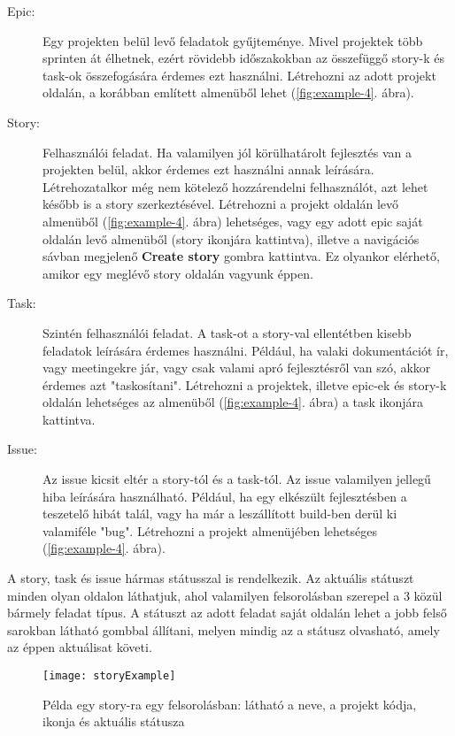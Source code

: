 \begin{description}
	\item[Epic:] Egy projekten belül levő feladatok gyűjteménye. Mivel projektek több sprinten át élhetnek, ezért rövidebb időszakokban az összefüggő story-k és task-ok összefogására érdemes ezt használni. Létrehozni az adott projekt oldalán, a korábban említett almenüből lehet (\ref{fig:example-4}. ábra). 
	\item[Story:] Felhasználói feladat. Ha valamilyen jól körülhatárolt fejlesztés van a projekten belül, akkor érdemes ezt használni annak leírására. Létrehozatalkor még nem kötelező hozzárendelni felhasználót, azt lehet később is a story szerkeztésével. Létrehozni a projekt oldalán levő almenüből (\ref{fig:example-4}. ábra) lehetséges, vagy egy adott epic saját oldalán levő almenüből (story ikonjára kattintva), illetve a navigációs sávban megjelenő \textbf{Create story} gombra kattintva. Ez olyankor elérhető, amikor egy meglévő story oldalán vagyunk éppen.
	\item[Task:] Szintén felhasználói feladat. A task-ot a story-val ellentétben kisebb feladatok leírására érdemes használni. Például, ha valaki dokumentációt ír, vagy meetingekre jár, vagy csak valami apró fejlesztésről van szó, akkor érdemes azt "taskosítani". Létrehozni a projektek, illetve epic-ek és story-k oldalán lehetséges az almenüből (\ref{fig:example-4}. ábra) a task ikonjára kattintva.
	\item[Issue:] Az issue kicsit eltér a story-tól és a task-tól. Az issue valamilyen jellegű hiba leírására használható. Például, ha egy elkészült fejlesztésben a teszetelő hibát talál, vagy ha már a leszállított build-ben derül ki valamiféle "bug". Létrehozni a projekt almenüjében lehetséges (\ref{fig:example-4}. ábra).
\end{description}

A story, task és issue hármas státusszal is rendelkezik. Az aktuális státuszt minden olyan oldalon láthatjuk, ahol valamilyen felsorolásban szerepel a 3 közül bármely feladat típus. A státuszt az adott feladat saját oldalán lehet a jobb felső sarokban látható gombbal állítani, melyen mindig az a státusz olvasható, amely az éppen aktuálisat követi.

\begin{figure}[H]
	\centering
	\texttt{[image: storyExample]}
	\caption{Példa egy story-ra egy felsorolásban: látható a neve, a projekt kódja, ikonja és aktuális státusza}
	\label{fig:example-6}
\end{figure}

